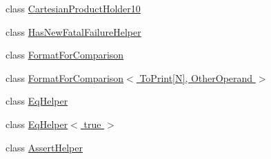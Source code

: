 \begin{DoxyCompactItemize}
\item 
class \hyperlink{classtesting_1_1internal_1_1CartesianProductHolder10}{Cartesian\-Product\-Holder10}
\item 
class \hyperlink{classtesting_1_1internal_1_1HasNewFatalFailureHelper}{Has\-New\-Fatal\-Failure\-Helper}
\item 
class \hyperlink{classtesting_1_1internal_1_1FormatForComparison}{Format\-For\-Comparison}
\item 
class \hyperlink{classtesting_1_1internal_1_1FormatForComparison_3_01ToPrint[N]_00_01OtherOperand_01_4}{Format\-For\-Comparison$<$ To\-Print\mbox{[}\-N\mbox{]}, Other\-Operand $>$}
\item 
class \hyperlink{classtesting_1_1internal_1_1EqHelper}{Eq\-Helper}
\item 
class \hyperlink{classtesting_1_1internal_1_1EqHelper_3_01true_01_4}{Eq\-Helper$<$ true $>$}
\item 
class \hyperlink{classtesting_1_1internal_1_1AssertHelper}{Assert\-Helper}
\end{DoxyCompactItemize}

